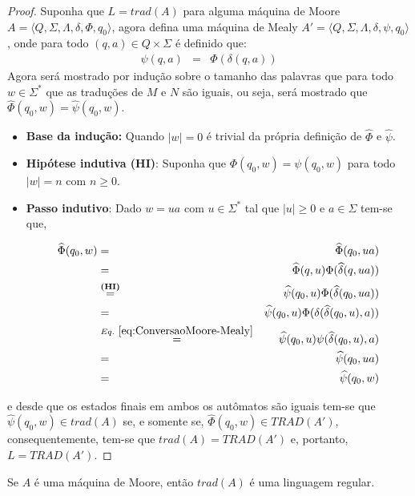 \begin{proof}
	Suponha que $L = trad(A)$ para alguma máquina de Moore $A = \langle Q, \Sigma, \Lambda, \delta, \Phi, q_0\rangle$, agora defina uma máquina de Mealy $A' = \langle Q, \Sigma, \Lambda, \delta, \psi, q_0\rangle$, onde para todo $(q, a) \in Q \times \Sigma$ é definido que:
	\begin{eqnarray}\label{eq:ConversaoMoore-Mealy}
		\psi(q, a) & = & \Phi(\delta(q, a))
	\end{eqnarray}
	Agora será mostrado por indução sobre o tamanho das palavras que para todo $w \in \Sigma^*$ que as traduções de $M$ e $N$ são iguais, ou seja, será mostrado que $\widehat{\Phi}(q_0, w) = \widehat{\psi}(q_0, w)$.
	\begin{itemize}
		\item \textbf{Base da indução:} Quando $|w| = 0$ é trivial da própria definição de $\widehat{\Phi}$ e $\widehat{\psi}$.
		\item \textbf{Hipótese indutiva (HI)}: Suponha que $\Phi(q_0, w) = \psi(q_0, w)$ para todo $|w| = n$ com $n \geq 0$.
		\item \textbf{Passo indutivo}: Dado $w = ua$ com $u \in \Sigma^*$ tal que $|u| \geq 0$ e $a \in \Sigma$ tem-se que,
		
		\begin{eqnarray*}
			\widehat{\Phi}(q_0, w) & = & \widehat{\Phi}(q_0, ua)\\
			& = & \widehat{\Phi}(q, u)\Phi(\widehat{\delta}(q, ua))\\
			& \stackrel{\textbf{(HI)}}{=} & \widehat{\psi}(q_0, u)\Phi(\widehat{\delta}(q_0, ua))\\
			& = & \widehat{\psi}(q_0, u)\Phi(\delta(\widehat{\delta}(q_0, u), a))\\
			& \stackrel{Eq. \ \ref{eq:ConversaoMoore-Mealy}}{=} & \widehat{\psi}(q_0, u)\psi(\widehat{\delta}(q_0, u), a)\\
			& = & \widehat{\psi}(q_0, ua)\\ 
			& = & \widehat{\psi}(q_0, w)
		\end{eqnarray*}
	\end{itemize}
	e desde que os estados finais em ambos os autômatos são iguais tem-se que $\widehat{\psi}(q_0, w) \in trad(A)$ se, e somente se, $\widehat{\Phi}(q_0, w) \in TRAD(A')$, consequentemente, tem-se que $trad(A) = TRAD(A')$ e, portanto, $L = TRAD(A')$.
\end{proof}

\begin{corollary}
	Se $A$ é uma máquina de Moore, então $trad(A)$ é uma linguagem regular.
\end{corollary}

